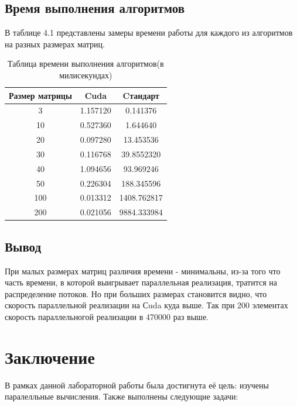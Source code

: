 \documentclass[12pt]{report}
\begin{document}
\section{Время выполнения алгоритмов}

В таблице 4.1 представлены замеры времени работы для каждого из алгоритмов на разных размерах матриц.

\begin{table} [h!]
	\caption{Таблица времени выполнения алгоритмов(в милисекундах)}
	\begin{center}
		\begin{tabular}{|c c c|} 
		 	\hline
			Размер матрицы & Cuda & Cтандарт \\  
			\hline
            3 & 1.157120 & 0.141376 \\ 
            \hline
            10 & 0.527360 & 1.644640 \\ 
            \hline
            20 & 0.097280 & 13.453536 \\ 
            \hline
            30 &  0.116768 & 39.8552320 \\ 
            \hline
            40 & 1.094656 & 93.969246 \\ 
            \hline
            50 & 0.226304 & 188.345596 \\ 
            \hline
            100 & 0.013312 & 1408.762817 \\ 
            \hline
            200 & 0.021056 & 9884.333984 \\ 
            \hline
		\end{tabular}
	\end{center}
\end{table}

\section{Вывод}
При малых размерах матриц различия времени - минимальны, из-за того что часть времени, в которой выигрывает параллельная реализация, тратится на распределение потоков. Но при больших размерах становится видно, что скорость параллельной реализации на Сuda куда выше. Так при 200 элементах скорость параллельногой реализации в 470000 раз выше.

\chapter*{Заключение}

В рамках данной лабораторной работы была достигнута её цель: изучены паралелльные вычисления. Также выполнены следующие задачи:
\end{document}
